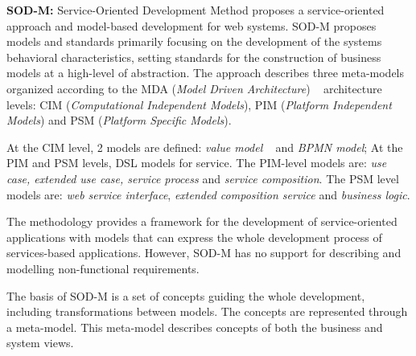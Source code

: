 \bigskip

\textbf{SOD-M:} Service-Oriented Development Method \cite{CastroMV11}
proposes a service-oriented approach and model-based development for web systems.
SOD-M proposes models and standards primarily focusing on the
development of the systems behavioral characteristics, setting standards for
the construction of business models at a high-level of abstraction. The approach
describes three  meta-models organized according to the MDA (\textit{Model
Driven Architecture}) ~\cite{miller} architecture levels: CIM (\textit{Computational
Independent Models}), PIM (\textit{Platform Independent Models}) and PSM
(\textit{Platform Specific Models}).

At the CIM level, 2 models are defined: \textit{value model}
~\cite{Gordijn02valuebased} and \textit{BPMN model};
At the PIM and PSM levels, DSL models for service. The
PIM-level models are: \textit{use case, extended use case, service process} and
\textit{service composition}. The PSM level models are: \textit{web
service interface}, \textit{extended composition service} and \textit{business
logic}. 


The methodology provides a framework for the development of
service-oriented applications with models that can express the whole
development process of services-based applications. However, SOD-M
has no support for describing and modelling non-functional requirements. 



The basis of SOD-M is a set of concepts guiding the whole
development, including transformations between models. The concepts are
represented through a meta-model. This meta-model describes concepts of both the
business and system views.
 

